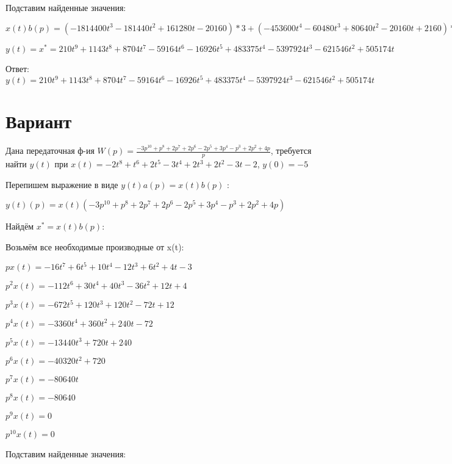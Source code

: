 \documentclass{article}
\begin{document}
{{{Подставим найденные значения:

$x(t)b(p) = (-1814400t^{3}-181440t^{2}+161280t-20160)*3+(-453600t^{4}-60480t^{3}+80640t^{2}-20160t+2160)*(-1)+(-15120t^{6}-3024t^{5}+6720t^{4}-3360t^{3}+1080t^{2}+360t+72)*4+(-2160t^{7}-504t^{6}+1344t^{5}-840t^{4}+360t^{3}+180t^{2}+72t+12)*(-4)+(-270t^{8}-72t^{7}+224t^{6}-168t^{5}+90t^{4}+60t^{3}+36t^{2}+12t-10)*(-4)+(-30t^{9}-9t^{8}+32t^{7}-28t^{6}+18t^{5}+15t^{4}+12t^{3}+6t^{2}-10t-4)*(-2)+(-30t^{9}-9t^{8}+32t^{7}-28t^{6}+18t^{5}+15t^{4}+12t^{3}+6t^{2}-10t-4)*(-5)=210t^{9}+1143t^{8}+8704t^{7}-59164t^{6}-16926t^{5}+483375t^{4}-5397924t^{3}-621546t^{2}+505174t$





$y(t)=x^*=210t^{9}+1143t^{8}+8704t^{7}-59164t^{6}-16926t^{5}+483375t^{4}-5397924t^{3}-621546t^{2}+505174t$

Ответ: $y(t) = 210t^{9}+1143t^{8}+8704t^{7}-59164t^{6}-16926t^{5}+483375t^{4}-5397924t^{3}-621546t^{2}+505174t$

\section{Вариант}

Дана передаточная ф-ия $W(p)=\frac{-3p^{10}+p^{8}+2p^{7}+2p^{6}-2p^{5}+3p^{4}-p^{3}+2p^{2}+4p}{p}$, требуется найти $y(t)$ при $x(t)=-2t^{8}+t^{6}+2t^{5}-3t^{4}+2t^{3}+2t^{2}-3t-2$, $y(0)=-5$

Перепишем выражение в виде $y(t)a(p)=x(t)b(p)$ :

$y(t)(p)=x(t)(-3p^{10}+p^{8}+2p^{7}+2p^{6}-2p^{5}+3p^{4}-p^{3}+2p^{2}+4p)$

Найдём $x^*=x(t)b(p)$:

Возьмём все необходимые производные от x(t):

$px(t)=-16t^{7}+6t^{5}+10t^{4}-12t^{3}+6t^{2}+4t-3$

$p^2x(t)=-112t^{6}+30t^{4}+40t^{3}-36t^{2}+12t+4$

$p^3x(t)=-672t^{5}+120t^{3}+120t^{2}-72t+12$

$p^4x(t)=-3360t^{4}+360t^{2}+240t-72$

$p^5x(t)=-13440t^{3}+720t+240$

$p^6x(t)=-40320t^{2}+720$

$p^7x(t)=-80640t$

$p^8x(t)=-80640$

$p^9x(t)=0$

$p^10x(t)=0$

Подставим найденные значения:

}}}
\end{document}
